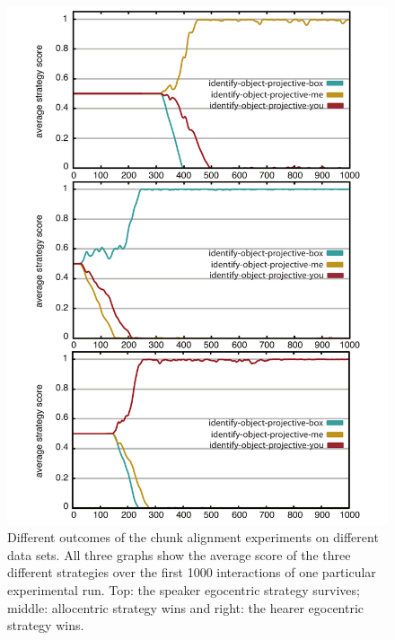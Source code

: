 \begin{figure}
\begin{centering}
\includegraphics[width=0.95\columnwidth]{figs/chunk-alignment-formation-projective-space-game-4-together}
\caption[Different outcomes of chunk alignment experiments]{
Different outcomes of the chunk alignment experiments on 
different data sets. All three graphs show the average score of the three different 
strategies over the first 1000 interactions of one particular experimental run. 
Top: the speaker egocentric strategy survives; middle: allocentric strategy 
wins and right: the hearer egocentric strategy wins.}
\label{f:chunk-alignment-different-outcomes}
\end{centering}
\end{figure}


